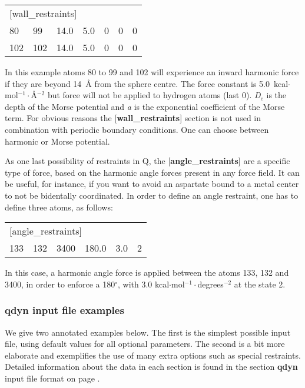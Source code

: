 \documentclass[a4paper,10pt]{article}
\begin{document}
\begin{center}
\begin{tabularx}{\textwidth}{|l l l l l l X|}
  \hline
  \multicolumn{7}{|l|}{[wall{\_}restraints]} \\
  80  & 99  & 14.0 & 5.0 & 0 & 0 & 0\\
  102 & 102 & 14.0 & 5.0 & 0 & 0 & 0\\ \hline
\end{tabularx}
\end{center}

In this example atoms 80 to 99 and 102 will experience an inward harmonic force
if they are beyond 14~{\AA} from the sphere centre. The force constant is
5.0~kcal$\cdot $mol$^{-1}\cdot ${\AA}$^{-2}$ but force will not be applied to
hydrogen atoms (last 0). \emph{D$_e$} is the depth of the Morse potential and
\emph{a }is the exponential coefficient of the Morse term. For obvious reasons
the [\textbf{wall{\_}restraints}] section is not used in combination with
periodic boundary conditions. One can choose between harmonic or Morse
potential.

As one last possibility of restraints in Q, the [\textbf{angle{\_}restraints}]
 are a specific type of force, based on the harmonic angle forces present in 
any force field. It can be useful, for instance, if you want to avoid an 
aspartate bound to a metal center to not be bidentally coordinated. In order 
to define an angle restraint, one has to define three atoms, as follows:

\begin{center}
\begin{tabularx}{\textwidth}{|l l l l l X|}
  \hline
  \multicolumn{6}{|l|}{[angle{\_}restraints]} \\
  133 & 132 & 3400 & 180.0 & 3.0 & 2 \\ \hline
\end{tabularx}
\end{center}

In this case, a harmonic angle force is applied between the atoms 133,
132 and 3400, in order to enforce a 180$^{\circ}$, with 3.0 kcal$\cdot
$mol$^{-1}\cdot ${degrees}$^{-2}$ at the state 2.\\


\subsubsection{\textbf{qdyn} input file examples}
We give two annotated examples below. The first is the simplest
possible input file, using default values for all optional
parameters. The second is a bit more elaborate and exemplifies the
use of many extra options such as special restraints. Detailed
information about the data in each section is found in the section
\textbf{qdyn} input file format on page
\pageref{subsubsec:qdyn_inp_file_form}.
\end{document}
